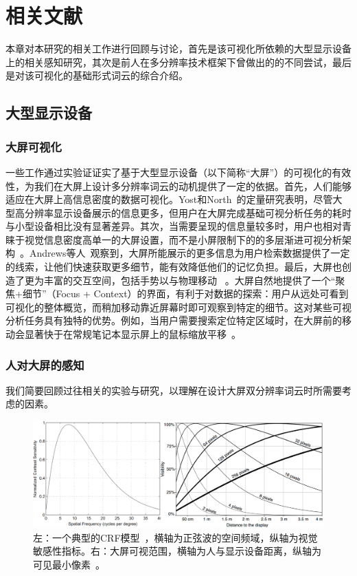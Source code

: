 
\chapter{相关文献}
本章对本研究的相关工作进行回顾与讨论，首先是该可视化所依赖的大型显示设备上的相关感知研究，其次是前人在多分辨率技术框架下曾做出的的不同尝试，最后是对该可视化的基础形式词云的综合介绍。

\section{大型显示设备}
\subsection{大屏可视化}
一些工作通过实验证证实了基于大型显示设备（以下简称``大屏''）的可视化的有效性，为我们在大屏上设计多分辨率词云的动机提供了一定的依据。首先，人们能够适应在大屏上高信息密度的数据可视化。Yost和North~\supercite{Yost2006}的定量研究表明，尽管大型高分辨率显示设备展示的信息更多，但用户在大屏完成基础可视分析任务的耗时与小型设备相比没有显著差异。其次，当需要呈现的信息量较多时，用户也相对青睐于视觉信息密度高单一的大屏设置，而不是小屏限制下的的多层渐进可视分析架构~\supercite{Lam2007}。Andrews等人~\supercite{Andrews2010}观察到，大屏所能展示的更多信息为用户检索数据提供了一定的线索，让他们快速获取更多细节，能有效降低他们的记忆负担。最后，大屏也创造了更为丰富的交互空间，包括手势以与物理移动~\supercite{Badam2016} 。大屏自然地提供了一个``聚焦+细节''（Focus + Context）的界面，有利于对数据的探索：用户从远处可看到可视化的整体概览，而稍加移动靠近屏幕时即可观察到特定的细节。这对某些可视分析任务具有独特的优势。例如，当用户需要搜索定位特定区域时，在大屏前的移动会显著快于在常规笔记本显示屏上的鼠标缩放平移~\supercite{Ball2005}。 

\subsection{人对大屏的感知}

我们简要回顾过往相关的实验与研究，以理解在设计大屏双分辨率词云时所需要考虑的因素。
\begin{figure}[htbp]
	\centering
	\includegraphics[width=\textwidth]{figures/function.png}
	\caption{左：一个典型的CRF模型~\supercite{Bull2014}，横轴为正弦波的空间频域，纵轴为视觉敏感性指标。右：大屏可视范围，横轴为人与显示设备距离，纵轴为可见最小像素~\supercite{Isenberg2013}。}
	\label{fig:function}
\end{figure}


